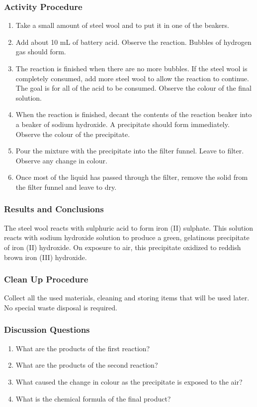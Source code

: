 \subsubsection*{Activity Procedure}
\begin{enumerate}
\item{Take a small amount of steel wool and to put it in one of the beakers.}
\item{Add about 10 mL of battery acid. Observe the reaction. Bubbles of hydrogen gas should form.}
\item{The reaction is finished when there are no more bubbles. If the steel wool is completely consumed, add more steel wool to allow the reaction to continue. The goal is for all of the acid to be consumed. Observe the colour of the final solution.}
\item{When the reaction is finished, decant the contents of the reaction beaker into a beaker of sodium hydroxide. A precipitate should form immediately. Observe the colour of the precipitate.}
\item{Pour the mixture with the precipitate into the filter funnel. Leave to filter. Observe any change in colour.}
\item{Once most of the liquid has passed through the filter, remove the solid from the filter funnel and leave to dry.}
\end{enumerate}

\subsubsection*{Results and Conclusions}
The steel wool reacts with sulphuric acid to form iron (II) sulphate. This solution reacts with sodium hydroxide solution to produce a green, gelatinous precipitate of iron (II) hydroxide. On exposure to air, this precipitate oxidized to reddish brown iron (III) hydroxide.

\subsubsection*{Clean Up Procedure}
Collect all the used materials, cleaning and storing items that will be used later. No special waste disposal is required.

\subsubsection*{Discussion Questions}
\begin{enumerate}
\item{What are the products of the first reaction?}
\item{What are the products of the second reaction?}
\item{What caused the change in colour as the precipitate is exposed to the air?}
\item{What is the chemical formula of the final product?}
\end{enumerate}

